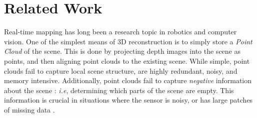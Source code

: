 \documentclass[conference,10pt]{IEEEtran}
\begin{document}
\section{Related Work}
Real-time mapping has long been a research topic in robotics and computer
vision. One of the simplest means of 3D reconstruction is to simply store a
\emph{Point Cloud} of the scene. This is done by projecting depth images into
the scene as points, and then aligning point clouds to the existing scene.
While simple, point clouds fail to capture local scene structure, are highly
redundant, noisy, and memory intensive. Additionally, point clouds fail to
capture \emph{negative} information about the scene : \emph{i.e}, determining
which parts of the scene are empty. This information is crucial in situations
where the sensor is noisy, or has large patches of missing data
\cite{Klingensmith2014}.
\end{document}
